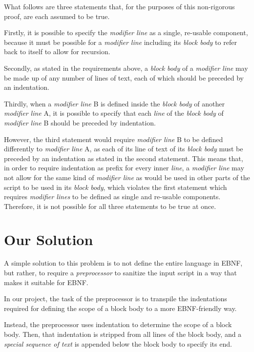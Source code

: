 What follows are three statements that, for the purposes of this non-rigorous proof, are each assumed to be true. 

Firstly, it is possible to specify the \textit{modifier line} as a single, re-usable component, because it must be possible for a \textit{modifier line} including its \textit{block body} to refer back to itself to allow for recursion. 

Secondly, as stated in the requirements above, a \textit{block body} of a \textit{modifier line} may be made up of any number of lines of text, each of which should be preceded by an indentation. 

Thirdly, when a \textit{modifier line} B is defined inside the \textit{block body} of another \textit{modifier line} A, it is possible to specify that each \textit{line} of the \textit{block body} of \textit{modifier line} B should be preceded by indentation.

However, the third statement would require \textit{modifier line} B to be defined differently to \textit{modifier line} A, as each of its line of text of its \textit{block body} must be preceded by an indentation as stated in the second statement. This means that, in order to require indentation as prefix for every inner \textit{line}, a \textit{modifier line} may not allow for the same kind of \textit{modifier line} as would be used in other parts of the script to be used in its \textit{block body}, which violates the first statement which requires \textit{modifier lines} to be defined as single and re-usable components. Therefore, it is not possible for all three statements to be true at once. 

\section{Our Solution}

A simple solution to this problem is to not define the entire language in EBNF, but rather, to require a \textit{preprocessor} to sanitize the input script in a way that makes it suitable for EBNF. 

In our project, the task of the preprocessor is to transpile the indentations required for defining the scope of a block body to a more EBNF-friendly way. 

Instead, the preprocessor uses indentation to determine the scope of a block body. Then, that indentation is stripped from all lines of the block body, and a \textit{special sequence of text} is appended below the block body to specify its end. 

